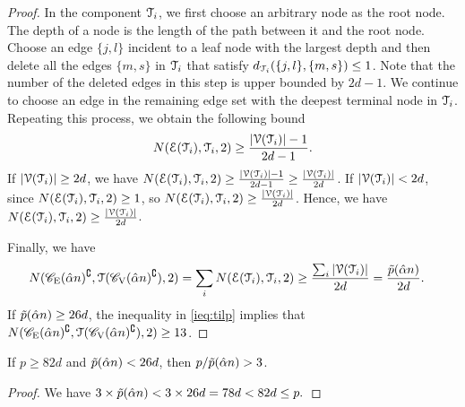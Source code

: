 \begin{proof}
	In the component $\mathcal{T}_{i}$, we first choose an arbitrary node as the root node. The depth of a node is the length of the path between it and the root node. Choose an edge $\{j,l\}$ 
	incident to a leaf node with the largest depth and then delete all the edges $\{m,s\}$ in $\mathcal{T}_{i}$ that satisfy $d_{\mathcal{T}_{i}}(\{j,l\},\{m,s\})\leq 1$. Note that the number of the deleted edges 
	in this step is upper bounded by $2d-1$. We continue to choose an edge in the remaining edge set with the deepest terminal node in $\mathcal{T}_{i}$. Repeating this process, we obtain the following bound
	\begin{align}
		N(\mathcal{E}(\mathcal{T}_{i}),\mathcal{T}_{i},2)\geq \frac{|\mathcal{V}(\mathcal{T}_{i})|-1}{2d-1}.
	\end{align}
	If $|\mathcal{V}(\mathcal{T}_{i})|\geq 2d$, we have $N(\mathcal{E}(\mathcal{T}_{i}),\mathcal{T}_{i},2)\geq\frac{|\mathcal{V}(\mathcal{T}_{i})|-1}{2d-1}\geq\frac{|\mathcal{V}(\mathcal{T}_{i})|}{2d}$. If $|\mathcal{V}(\mathcal{T}_{i})|< 2d$, since $N(\mathcal{E}(\mathcal{T}_{i}),\mathcal{T}_{i},2)\geq 1$, so $N(\mathcal{E}(\mathcal{T}_{i}),\mathcal{T}_{i},2)\geq \frac{|\mathcal{V}(\mathcal{T}_{i})|}{2d}$. Hence, we have  $N(\mathcal{E}(\mathcal{T}_{i}),\mathcal{T}_{i},2)\geq \frac{|\mathcal{V}(\mathcal{T}_{i})|}{2d}$.


	Finally, we have
	\begin{align}\label{ieq:tilp}
		N(\mathscr{C}_{\mathrm{E}}(\hat{\alpha} n)^{\complement},\mathcal{T}(\mathscr{C}_{\mathrm{V}}(\hat{\alpha} n)^{\complement}),2)&=\sum_{i} N(\mathcal{E}(\mathcal{T}_{i}),\mathcal{T}_{i},2)\geq \frac{\sum_{i}|\mathcal{V}(\mathcal{T}_{i})|}{2d}=\frac{\tilde{p}(\hat{\alpha} n)}{2d}.
	\end{align}
	If $\tilde{p}(\hat{\alpha} n)\geq 26d$, the inequality in \eqref{ieq:tilp} implies that $N(\mathscr{C}_{\mathrm{E}}(\hat{\alpha} n)^{\complement},\mathcal{T}(\mathscr{C}_{\mathrm{V}}(\hat{\alpha} n)^{\complement}),2)\geq 13$.
\end{proof}

\begin{lemma}\label{lem:numsample}
	If $p\geq 82d$ and $\tilde{p}(\hat{\alpha} n)<26d$, then $p/ \tilde{p}(\hat{\alpha} n)>3$.
\end{lemma}
\begin{proof}
    We have
	$
		3\times \tilde{p}(\hat{\alpha} n) <3\times 26d=78d<82d\leq p.
	$
\end{proof}

